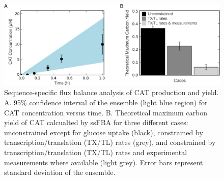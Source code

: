 \documentclass[12pt]{article}
\begin{document}
\begin{figure}[ht]
\centering
\includegraphics[width=1\textwidth]{./Figures/CAT_prod_yield.pdf}
\caption{Sequence-specific flux balance analysis of CAT production and yield. A. 95\% confidence interval of the ensemble (light blue region) for CAT concentration versus time. B. Theoretical maximum carbon yield of CAT calcualted by ssFBA for three different cases: unconstrained except for glucose uptake (black), constrained by transcription/translation (TX/TL) rates (grey), and constrained by transcription/translation (TX/TL) rates and experimental measurements where available (light grey). Error bars represent standard deviation of the ensemble.}
\label{fig:CATProdYield}
\end{figure}
\clearpage
\end{document}
